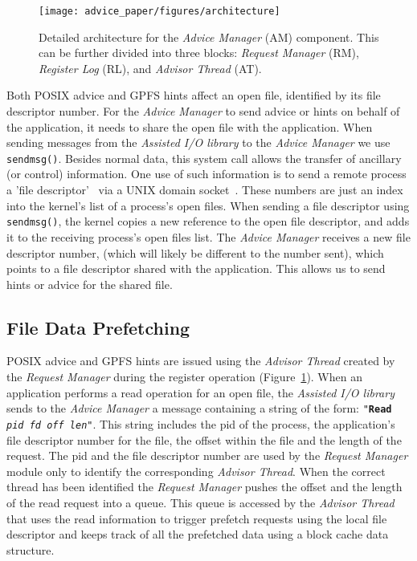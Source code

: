 \begin{figure}[!htb]
  \centering
  \texttt{[image: advice\_paper/figures/architecture]}
  \caption{Detailed architecture for the \textit{Advice Manager} (AM) component. This can be further divided into three blocks: \textit{Request Manager} (RM), \textit{Register Log} (RL), and \textit{Advisor Thread} (AT).}
  \label{figure: architecture}
\end{figure}

Both POSIX advice and GPFS hints affect an open file, identified by its file descriptor number. For the \textit{Advice Manager} to send advice or hints on behalf of the application, it needs to share the open file with the application. When sending messages from the \textit{Assisted I/O library} to the \textit{Advice Manager} we use \texttt{sendmsg()}. Besides normal data, this system call allows the transfer of ancillary (or control) information. One use of such information is to send a remote process a 'file descriptor'~\cite{StevensR13} via a UNIX domain socket~\cite{UnixSock}. These numbers are just an index into the kernel's list of a process's open files. When sending a file descriptor using \texttt{sendmsg()}, the kernel copies a new reference to the open file descriptor, and adds it to the receiving process's open files list. The \textit{Advice Manager} receives a new file descriptor number, (which will likely be different to the number sent), which points to a file descriptor shared with the application. This allows us to send hints or advice for the shared file.

\subsection{File Data Prefetching}
\label{subsec: data_prefetching}
POSIX advice and GPFS hints are issued using the \textit{Advisor Thread} created by the \textit{Request Manager} during the register operation (Figure~\ref{figure: architecture}). When an application performs a read operation for an open file, the \textit{Assisted I/O library} sends to the \textit{Advice Manager} a message containing a string of the form: \texttt{"\textbf{Read} \textit{pid} \textit{fd} \textit{off} \textit{len}"}. This string includes the pid of the process, the application's file descriptor number for the file, the offset within the file and the length of the request. The pid and the file descriptor number are used by the \textit{Request Manager} module only to identify the corresponding \textit{Advisor Thread}. When the correct thread has been identified the \textit{Request Manager} pushes the offset and the length of the read request into a queue. This queue is accessed by the \textit{Advisor Thread} that uses the read information to trigger prefetch requests using the local file descriptor and keeps track of all the prefetched data using a block cache data structure. %

